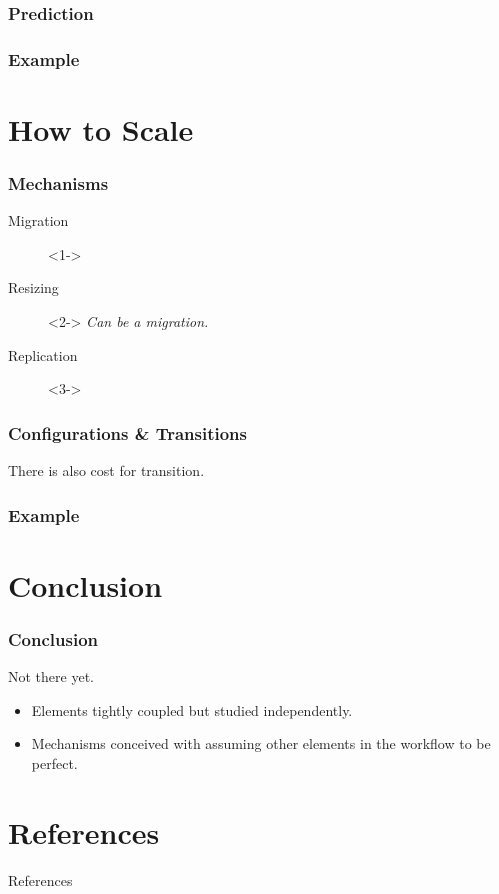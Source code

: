 \documentclass{beamer}
\begin{document}
\begin{frame}
  \frametitle{Prediction}
\end{frame}

\begin{frame}
  \frametitle{Example~\cite{moore2013coordinated}}
\end{frame}


\section{How to Scale}
\begin{frame}
  \frametitle{Mechanisms}
  \begin{description}
    \item[Migration]<1->
    \item[Resizing]<2-> \textit{Can be a migration.}
    \item[Replication]<3->
  \end{description}
\end{frame}

\begin{frame}
  \frametitle{Configurations \& Transitions}
  \vspace*{\fill}
  There is also cost for transition.
\end{frame}

\begin{frame}
  \frametitle{Example~\cite{sharma2011cost}}
\end{frame}


\section*{Conclusion}
\begin{frame}
  \frametitle{Conclusion}
  Not there yet.
  \begin{itemize}
    \item Elements tightly coupled but studied independently.
    \item Mechanisms conceived with assuming other elements in the workflow to be perfect.
  \end{itemize}
\end{frame}


\appendix
\section*{References}
\begin{frame}[allowframebreaks]{References}
  
  
\end{frame}
\end{document}
